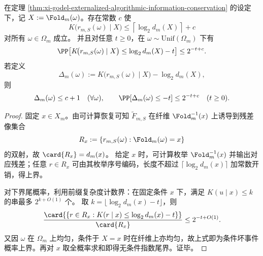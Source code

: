 \begin{theorem}[条件复杂度与纤维对数体积的双侧夹逼及指数尾界]\label{thm:xi-register-conditional-complexity-vs-fiber-volume}
在定理 \ref{thm:xi-godel-externalized-algorithmic-information-conservation} 的设定下，记 \(X:=\Fold_m(\omega)\)。存在常数 \(c\) 使
\[
K\!\bigl(r_{m,S}(\omega)\mid X\bigr)\le \left\lceil\log_2 d_m(X)\right\rceil+c
\]
对所有 \(\omega\in\Omega_m\) 成立。
并且对任意 \(t\ge 0\)，在 \(\omega\sim\mathrm{Unif}(\Omega_m)\) 下有
\[
\PP\!\left[
K\!\bigl(r_{m,S}(\omega)\mid X\bigr)\le \log_2 d_m(X)-t
\right]\le 2^{-t+c}.
\]
若定义
\[
\Delta_m(\omega):=K\!\bigl(r_{m,S}(\omega)\mid X\bigr)-\log_2 d_m(X),
\]
则
\[
\Delta_m(\omega)\le c+1\quad(\forall \omega),
\qquad
\PP\!\left[\Delta_m(\omega)\le -t\right]\le 2^{-t+c}\quad(t\ge0).
\]
\end{theorem}
\begin{proof}
固定 \(x\in X_m\)。由可计算恢复可知 \(\widetilde F_{m,S}\) 在纤维 \(\Fold_m^{-1}(x)\) 上诱导到残差像集合
\[
R_x:=\{r_{m,S}(\omega):\Fold_m(\omega)=x\}
\]
的双射，故 \(\card{R_x}=d_m(x)\)。
给定 \(x\) 时，可计算枚举 \(\Fold_m^{-1}(x)\) 并输出对应残差；任意 \(r\in R_x\) 可由其枚举序号编码，长度不超过 \(\lceil\log_2 d_m(x)\rceil\) 加常数开销，得上界。

对下界尾概率，利用前缀复杂度计数界：在固定条件 \(x\) 下，满足 \(K(u\mid x)\le k\) 的串最多 \(2^{k+O(1)}\) 个。
取 \(k=\lfloor \log_2 d_m(x)-t\rfloor\)，则
\[
\frac{\card{\{r\in R_x:K(r\mid x)\le \log_2 d_m(x)-t\}}}{\card{R_x}}
\le 2^{-t+O(1)}.
\]
又因 \(\omega\) 在 \(\Omega_m\) 上均匀，条件于 \(X=x\) 时在纤维上亦均匀，故上式即为条件坏事件概率上界。再对 \(x\) 取全概率求和即得无条件指数尾界。证毕。
\end{proof}

